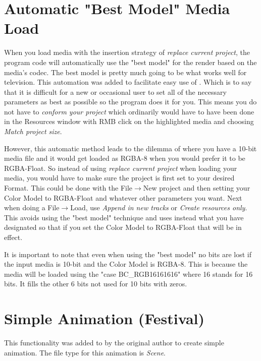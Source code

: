\section{Automatic "Best Model" Media Load}%
\label{sec:conform_the_project}
When you load media with the insertion strategy of \textit{replace current project}, the program code will
automatically use the "best model" for the render based on the media's codec.  The best model is pretty
much going to be what works well for television.  This automation was added to facilitate easy use of
\CGG{}.  Which is to say that it is difficult for a new or occasional user to set all of the 
necessary parameters as best as possible so the program does it for you.  This means you do not have to 
\textit{conform your project} which ordinarily would have to have been done in the Resources window with RMB
click on the highlighted media and choosing \textit{Match project size}. 

However, this automatic method leads to the dilemma of where you have a 10-bit media file and it would
get loaded as RGBA-8 when you would prefer it to be RGBA-Float.  So instead of using \textit{replace current
project} when loading your media, you would have to make sure the project is first set to your desired
Format.  This could be done with the File$\rightarrow$New project and then setting your Color
Model to RGBA-Float and whatever other parameters you want.  Next when doing a File$\rightarrow$Load, use
\textit{Append in new tracks} or \textit{Create resources only}. This avoids using the "best model"
technique and uses instead what you have designated so that if you set the Color Model to RGBA-Float that
will be in effect.

It is important to note that even when using the "best model" no bits are lost if the input media is 10-bit
and the Color Model is RGBA-8. This is because the media will be loaded using the "case BC\_RGB16161616"
where 16 stands for 16 bits. It fills the other 6 bits not used for 10 bits with zeros.

\section{Simple Animation (Festival)}%
\label{sec:simple_animation_festival}

This functionality was added to \CGG{} by the original author to create simple animation.  The file type for this animation is \textit{Scene}.

